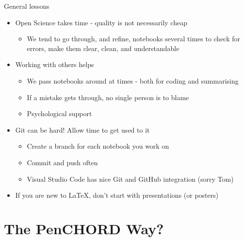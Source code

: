 \documentclass[xcolor={usenames,dvipsnames}]{beamer}
\begin{document}
\begin{frame}{General lessons}

\begin{itemize}
    \setlength\itemsep{3mm}
    \item Open Science takes time - quality is not necessarily cheap
        \begin{itemize}
            \item We tend to go through, and refine, notebooks several times to check for errors, make them clear, clean, and understandable
        \end{itemize}
    \item Working with others helps
        \begin{itemize}
            \item We pass notebooks around at times - both for coding and summarising
            \item If a mistake gets through, no single person is to blame
            \item Psychological support
        \end{itemize}
    \item Git can be hard! Allow time to get used to it
    \begin{itemize}
            \item Create a branch for each notebook you work on
            \item Commit and push often
            \item Visual Studio Code has nice Git and GitHub integration (sorry Tom)
        \end{itemize}
    \item If you are new to \LaTeX, don't start with presentations (or posters)
\end{itemize}

\end{frame}

\section{The PenCHORD Way?}
\end{document}
